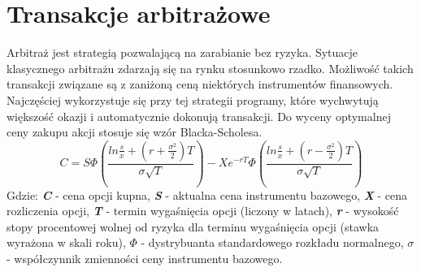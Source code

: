 \documentclass{report}
\begin{document}
\section{Transakcje arbitrażowe}
Arbitraż\cite{perz2008sztuka} jest strategią pozwalającą na zarabianie bez ryzyka. Sytuacje klasycznego arbitrażu zdarzają się na rynku stosunkowo rzadko. Możliwość takich transakcji związane są z zaniżoną ceną niektórych instrumentów finansowych. Najczęściej wykorzystuje się przy tej strategii programy, które wychwytują większość okazji i automatycznie dokonują transakcji.
Do wyceny optymalnej ceny zakupu akcji stosuje się wzór Blacka-Scholesa.\cite{wzor16}
\begin{displaymath}
C=S\Phi \left(\frac{ln\frac{s}{x}+(r+\frac{\sigma^2}{2})T}{\sigma \sqrt{T}}\right)-Xe^{-rT}\Phi \left(\frac{ln\frac{s}{x}+(r-\frac{\sigma^2}{2})T}{\sigma \sqrt{T}}\right)
\end{displaymath}
Gdzie:
\newline \textbf{\textit{C}} - cena opcji kupna,
\newline \textbf{\textit{S}} - aktualna cena instrumentu bazowego,
\newline \textbf{\textit{X}} - cena rozliczenia opcji,
\newline \textbf{\textit{T}} - termin wygaśnięcia opcji (liczony w latach),
\newline \textbf{\textit{r}} - wysokość stopy procentowej wolnej od ryzyka dla terminu wygaśnięcia opcji (stawka wyrażona w skali roku),
\newline \begin{math} \Phi \end{math} - dystrybuanta standardowego rozkładu normalnego,
\newline \begin{math} \sigma \end{math} - współczynnik zmienności ceny instrumentu bazowego.
\newpage
\listoffigures
\listoftables


\end{document}
